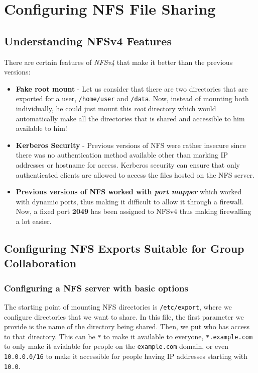 \chapter{Configuring NFS File Sharing}

\section{Understanding NFSv4 Features}
There are certain features of \textit{NFSv4} that make it better than the previous versions:
\begin{itemize}
	\item \textbf{Fake root mount} - Let us consider that there are two directories that are exported for a user, \verb|/home/user| and \verb|/data|. Now, instead of mounting both individually, he could just mount this \textit{root} directory which would automatically make all the directories that is shared and accessible to him available to him!
	
	\item \textbf{Kerberos Security} - Previous versions of NFS were rather insecure since there was no authentication method available other than marking IP addresses or hostname for access. Kerberos security can ensure that only authenticated clients are allowed to access the files hosted on the NFS server. 
	
	\item \textbf{Previous versions of NFS worked with \textit{port mapper}} which worked with dynamic ports, thus making it difficult to allow it through a firewall. Now, a fixed port \textbf{2049} has been assigned to NFSv4 thus making firewalling a lot easier. 
\end{itemize}

\section{Configuring NFS Exports Suitable for Group Collaboration}
\subsection{Configuring a NFS server with basic options}
The starting point of mounting NFS directories is \verb|/etc/export|, where we configure directories that we want to share. In this file, the first parameter we provide is the name of the directory being shared. Then, we put who has access to that directory. This can be \verb|*| to make it available to everyone, \verb|*.example.com| to only make it avialable for people on the \verb|example.com| domain, or even \verb|10.0.0.0/16| to make it accessible for people having IP addresses starting with \verb|10.0|. 

